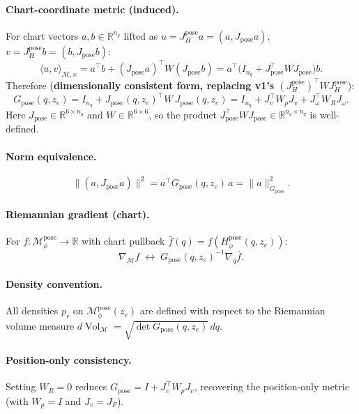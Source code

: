 \documentclass[11pt,a4paper]{article}
\DeclareMathOperator{\Vol}{Vol}
\newcommand{\R}{\mathbb{R}}
\newcommand{\Mset}{\mathcal{M}}
\newcommand{\Mpose}{\mathcal{M}_\phi^{\text{pose}}}
\newcommand{\Hpose}{H_\phi^{\text{pose}}}
\newcommand{\Jpose}{J_{\text{pose}}}
\begin{document}
\paragraph{Chart-coordinate metric (induced).} For chart vectors $a, b \in \R^{n_q}$ lifted as $u = J_H^{\text{pose}} a = (a, \Jpose a)$, $v = J_H^{\text{pose}} b = (b, \Jpose b)$:
\begin{equation}
\bigl\langle u, v \bigr\rangle_{\Mset, x} = a^\top b + (\Jpose a)^\top W (\Jpose b) = a^\top \bigl( I_{n_q} + \Jpose^\top W \Jpose \bigr) b.
\end{equation}
Therefore (\textbf{dimensionally consistent form, replacing v1's $(J_H^{\text{pose}})^\top W J_H^{\text{pose}}$}):
\begin{equation}
\boxed{ G_{\text{pose}}(q, z_e) = I_{n_q} + \Jpose(q, z_e)^\top W \, \Jpose(q, z_e) = I_{n_q} + J_v^\top W_p J_v + J_\omega^\top W_R J_\omega. }
\end{equation}
Here $\Jpose \in \R^{6 \times n_q}$ and $W \in \R^{6 \times 6}$, so the product $\Jpose^\top W \Jpose \in \R^{n_q \times n_q}$ is well-defined.

\paragraph{Norm equivalence.}
\begin{equation}
\bigl\| (a, \Jpose a) \bigr\|^2 = a^\top G_{\text{pose}}(q, z_e) \, a = \| a \|_{G_{\text{pose}}}^2.
\end{equation}

\paragraph{Riemannian gradient (chart).} For $f : \Mpose \to \R$ with chart pullback $\bar f(q) = f(\Hpose(q, z_e))$:
\begin{equation}
\nabla_{\Mset} f \;\leftrightarrow\; G_{\text{pose}}(q, z_e)^{-1} \nabla_q \bar f.
\end{equation}

\paragraph{Density convention.} All densities $p_r$ on $\Mpose(z_e)$ are defined with respect to the Riemannian volume measure $d\Vol_{\Mset} = \sqrt{\det G_{\text{pose}}(q, z_e)} \, dq$.

\paragraph{Position-only consistency.} Setting $W_R = 0$ reduces $G_{\text{pose}} = I + J_v^\top W_p J_v$, recovering the position-only metric (with $W_p = I$ and $J_v = J_F$).
\end{document}
